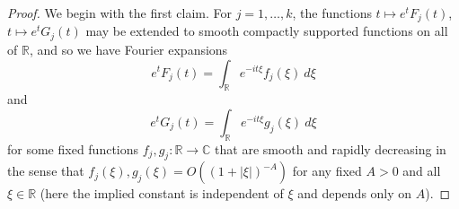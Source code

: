 \documentclass{bmcart}
\theoremstyle{plain}
\theoremstyle{definition}
\newcommand\R{\mathbb{R}}
\newcommand\C{\mathbb{C}}
\begin{document}
\begin{proof}  We begin with the first claim.
For $j=1,\dots,k$, the functions $t \mapsto e^t F_j(t)$, $t \mapsto e^t G_j(t)$ may be extended to smooth compactly supported functions on all of $\R$, and so we have Fourier expansions
\begin{equation}\label{etf}
 e^t F_j(t) = \int_\R e^{-it\xi} f_j(\xi)\ d\xi
\end{equation}
and
$$ e^t G_j(t) = \int_\R e^{-it\xi} g_j(\xi)\ d\xi$$
for some fixed functions $f_j, g_j: \R \to \C$ that are smooth and rapidly decreasing in the sense that $f_j(\xi), g_j(\xi) = O( (1+|\xi|)^{-A} )$ for any fixed $A>0$ and all $\xi \in \R$ %
(here the implied constant is independent of $\xi$ and depends only on $A$).  


\end{proof}
\end{document}
